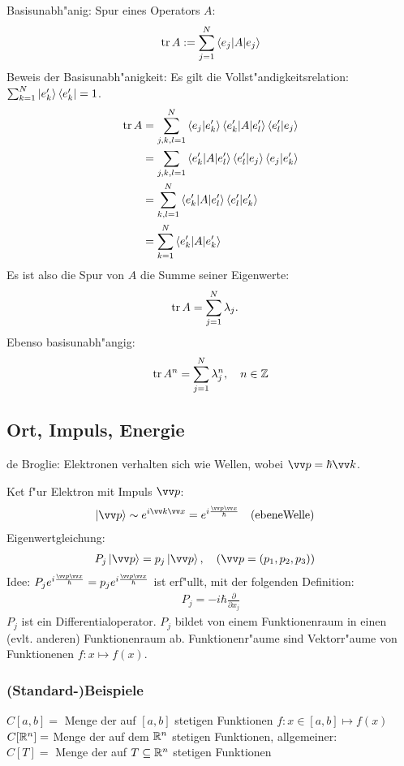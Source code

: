 \documentclass[a4paper]{scrartcl}
\begin{document}
{Basisunabh"anig: Spur eines Operators $A$:
\begin{align}
\mathrm{tr} \, A := \sum_{j=1}^N \braket {e_j | A | e_j }
\end{align}
Beweis der Basisunabh"anigkeit: Es gilt die Vollst"andigkeitsrelation: $\sum_{k=1}^N \ket{e_k'} \bra{e_k'} = 1$.
\begin{align*}
\mathrm{tr} \, A & = \sum_{j,k,l =1}^N \braket{ e_j | e_k'} \braket{ e_k' | A | e_l'} \braket{e_l' | e_j} \\
& = \sum_{j,k,l=1} \braket{ e_k' | A | e_l' } \braket{ e_l' | e_j} \braket{e_j | e_k'} \\
& = \sum_{k,l=1}^N \braket{ e_k' | A | e_l'} \braket{ e_l' | e_k'} \\
& = \sum_{k=1}^N \braket{ e_k' | A | e_k'}
\end{align*} 
Es ist also die Spur von $A$ die Summe seiner Eigenwerte:
\begin{align}
\mathrm{tr} \, A & = \sum_{j=1}^N \lambda_j.
\end{align}
Ebenso basisunabh"angig:
\begin{align}
\mathrm{tr} \, A^n = \sum_{j=1}^N \lambda_j^n, \quad n \in \mathbb{Z}
\end{align}

\subsection{Ort, Impuls, Energie}
de Broglie: Elektronen verhalten sich wie Wellen, wobei $\vv p = \hbar \vv k$.

Ket f"ur Elektron mit Impuls $\vv p$:
\begin{align}
\ket{\vv p } & \sim e^{i \vv k \vv x} = e^{i \frac{\vv p \vv x}{\hbar}} \quad \mathrm{(ebene Welle)}
\end{align}
Eigenwertgleichung:
\begin{align}
P_j \ket { \vv p} & = p_j \ket{\vv p}, \quad (\vv p = (p_1, p_2, p_3))
\end{align}
Idee: $P_j e^{i \frac{ \vv p \vv x}{\hbar}} = p_j e^{i \frac{ \vv p \vv x }{\hbar}}$ ist erf"ullt, mit der folgenden Definition:
\begin{align}
P_j = -i\hbar \frac{\partial}{\partial x_j}
\end{align}
$P_j$ ist ein Differentialoperator. $P_j$ bildet von einem Funktionenraum in einen (evlt. anderen) Funktionenraum ab. Funktionenr"aume sind Vektorr"aume von Funktionenen $f: x \mapsto f(x)$.

\subsubsection*{(Standard-)Beispiele}
\begin{1aufz}
\item $C[a,b] = $ Menge der auf $[a,b]$ stetigen Funktionen $f: x \in [a,b] \mapsto f(x)$ \\
$C[\mathbb{R}^n] = $ Menge der auf dem $\mathbb{R}^n$ stetigen Funktionen, allgemeiner: \\
$C[T] = $ Menge der auf $T \subseteq \mathbb{R}^n$ stetigen Funktionen


\end{1aufz}}
\end{document}
